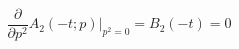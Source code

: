 \begin{equation}
\frac{\partial}{\partial p^2} A_2 (-t; p)\Bigg|_{p^2=0} = B_2 (-t) = 0
\label{tdepconditions}
\end{equation}

